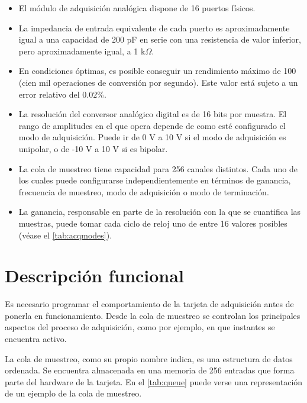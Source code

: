 \begin{itemize}
    \item El módulo de adquisición analógica dispone de 16 puertos físicos.
    \item La impedancia de entrada equivalente de cada puerto es
	aproximadamente igual a una capacidad de 200 pF en serie con una
	resistencia de valor inferior, pero aproximadamente igual, a 1
	k$\Omega$.
    \item En condiciones óptimas, es posible conseguir un rendimiento
	máximo de 100 \kms{} (cien mil operaciones de conversión por
	segundo). Este valor está sujeto a un error relativo del $0.02\%$.
    \item La resolución del conversor analógico digital es de 16 bits por
	muestra. El rango de amplitudes en el que opera depende de como
	esté configurado el modo de adquisición. Puede ir de 0 V a 10 V si
	el modo de adquisición es unipolar, o de -10 V a 10 V si es
	bipolar.
    \item La cola de muestreo tiene capacidad para 256 canales distintos.
	Cada uno de los cuales puede configurarse independientemente en
	términos de ganancia, frecuencia de muestreo, modo de adquisición o
	modo de terminación.
    \item La ganancia, responsable en parte de la resolución con la que se
	cuantifica las muestras, puede tomar cada ciclo de reloj uno de
	entre 16 valores posibles (véase el \vref{tab:acqmodes}).
\end{itemize}


\section{Descripción funcional}\label{sec:funcdesc}

Es necesario programar el comportamiento de la tarjeta de adquisición antes
de ponerla en funcionamiento. Desde la cola de muestreo se controlan los
principales aspectos del proceso de adquisición, como por ejemplo, en que
instantes se encuentra activo.

La cola de muestreo, como su propio nombre indica, es una estructura de
datos ordenada. Se encuentra almacenada en una memoria  de 256
entradas que forma parte del hardware de la tarjeta. En el \cref{tab:queue}
puede verse una representación de un ejemplo de la cola de muestreo.

